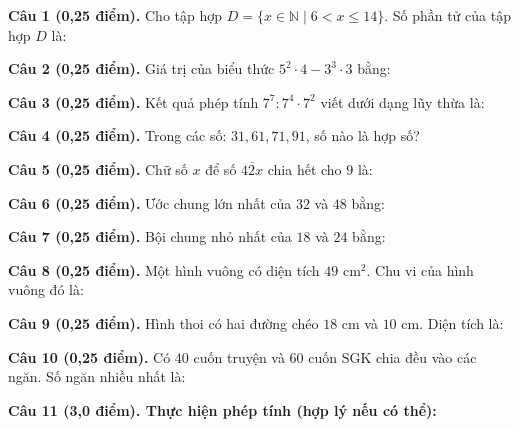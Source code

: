 \documentclass[12pt,a4paper]{article}
\begin{document}
\noindent\textbf{Câu 1 (0,25 điểm).} Cho tập hợp $D = \{x \in \mathbb{N} \mid 6 < x \le 14\}$. Số phần tử của tập hợp $D$ là: \par\vspace{0.25mm}
\noindent\textbf{Câu 2 (0,25 điểm).} Giá trị của biểu thức $5^2 \cdot 4 - 3^3 \cdot 3$ bằng: \par\vspace{0.25mm}
\noindent\textbf{Câu 3 (0,25 điểm).} Kết quả phép tính $7^7 : 7^4 \cdot 7^2$ viết dưới dạng lũy thừa là: \par\vspace{0.25mm}
\noindent\textbf{Câu 4 (0,25 điểm).} Trong các số: $31, 61, 71, 91$, số nào là hợp số? \par\vspace{0.25mm}
\noindent\textbf{Câu 5 (0,25 điểm).} Chữ số $x$ để số $\overline{42x}$ chia hết cho $9$ là: \par\vspace{0.25mm}
\noindent\textbf{Câu 6 (0,25 điểm).} Ước chung lớn nhất của $32$ và $48$ bằng: \par\vspace{0.25mm}
\noindent\textbf{Câu 7 (0,25 điểm).} Bội chung nhỏ nhất của $18$ và $24$ bằng: \par\vspace{0.25mm}
\noindent\textbf{Câu 8 (0,25 điểm).} Một hình vuông có diện tích $49\text{ cm}^2$. Chu vi của hình vuông đó là: \par\vspace{0.25mm}
\noindent\textbf{Câu 9 (0,25 điểm).} Hình thoi có hai đường chéo $18\text{ cm}$ và $10\text{ cm}$. Diện tích là: \par\vspace{0.25mm}
\noindent\textbf{Câu 10 (0,25 điểm).} Có $40$ cuốn truyện và $60$ cuốn SGK chia đều vào các ngăn. Số ngăn nhiều nhất là: \par\vspace{0.25mm}

\vspace{0.3mm}
\noindent\textbf{Câu 11 (3,0 điểm). Thực hiện phép tính (hợp lý nếu có thể):}
\vspace{0.4mm}
\end{document}
